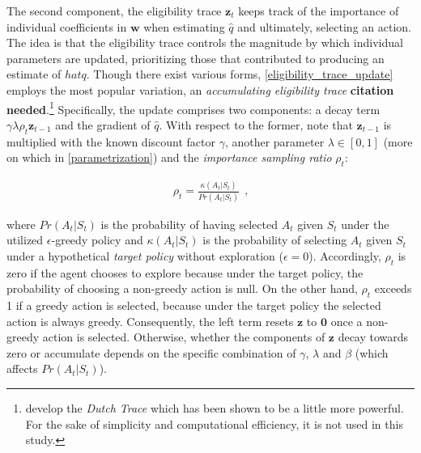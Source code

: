 The second component, the eligibility trace $\boldsymbol{z}_t$ keeps track of the importance of individual coefficients in $\boldsymbol{w}$ when estimating $\hat{q}$ and ultimately, selecting an action. The idea is that the eligibility trace controls the magnitude by which individual parameters are updated, prioritizing those that contributed to producing an estimate of $hat{q}$. Though there exist various forms, \autoref{eligibility_trace_update} employs the most popular variation, an \emph{accumulating eligibility trace} \textbf{citation needed}.\footnote{\textcite{seijen_true_2014} develop the \emph{Dutch Trace} which has been shown to be a little more powerful. For the sake of simplicity and computational efficiency, it is not used in this study.} Specifically, the update comprises two components: a decay term $\gamma \lambda \rho_t \boldsymbol{z}_{t-1}$ and the gradient of $\hat{q}$. With respect to the former, note that $\boldsymbol{z}_{t-1}$ is multiplied with the known discount factor $\gamma$, another parameter $\lambda \in [0,1]$ (more on which in \autoref{parametrization}) and the \emph{importance sampling ratio} $\rho_t$:

\begin{gather}
	 \rho_t = \frac{\kappa(A_t|S_{t})}{Pr(A_t|S_t)} ~~  \text{,}
\end{gather}

where $Pr(A_t|S_t)$ is the probability of having selected $A_t$ given $S_t$ under the utilized $\epsilon$-greedy policy and $\kappa(A_t|S_t)$ is the probability of selecting $A_t$ given $S_t$ under a hypothetical \emph{target policy} without exploration ($\epsilon = 0$). Accordingly, $\rho_t$ is zero if the agent chooses to explore because under the target policy, the probability of choosing a non-greedy action is null. On the other hand, $\rho_t$ exceeds 1 if a greedy action is selected, because under the target policy the selected action is always greedy. Consequently, the left term resets $\boldsymbol{z}$ to $\boldsymbol{0}$ once a non-greedy action is selected. Otherwise, whether the components of $\boldsymbol{z}$ decay towards zero or accumulate depends on the specific combination of $\gamma$, $\lambda$ and $\beta$ (which affects $Pr(A_t|S_t)$).


